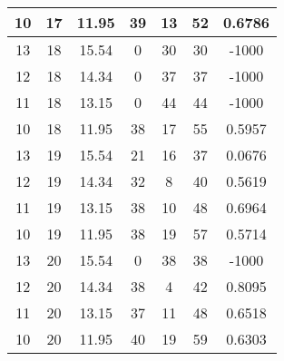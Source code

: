 \documentclass[letterpaper, 12pt]{article}
\begin{document}
\begin{longtable}{|c|c|c|c|c|c|c|}
10 & 17 & 11.95 & 39 & 13 & 52 & 0.6786 \\
\hline
13 & 18 & 15.54 & 0 & 30 & 30 & -1000 \\
\hline
12 & 18 & 14.34 & 0 & 37 & 37 & -1000 \\
\hline
11 & 18 & 13.15 & 0 & 44 & 44 & -1000 \\
\hline
10 & 18 & 11.95 & 38 & 17 & 55 & 0.5957 \\
\hline
13 & 19 & 15.54 & 21 & 16 & 37 & 0.0676 \\
\hline
12 & 19 & 14.34 & 32 & 8 & 40 & 0.5619 \\
\hline
11 & 19 & 13.15 & 38 & 10 & 48 & 0.6964 \\
\hline
10 & 19 & 11.95 & 38 & 19 & 57 & 0.5714 \\
\hline
13 & 20 & 15.54 & 0 & 38 & 38 & -1000 \\
\hline
12 & 20 & 14.34 & 38 & 4 & 42 & 0.8095 \\
\hline
11 & 20 & 13.15 & 37 & 11 & 48 & 0.6518 \\
\hline
10 & 20 & 11.95 & 40 & 19 & 59 & 0.6303 \\
\hline
\end{longtable}
\end{document}
